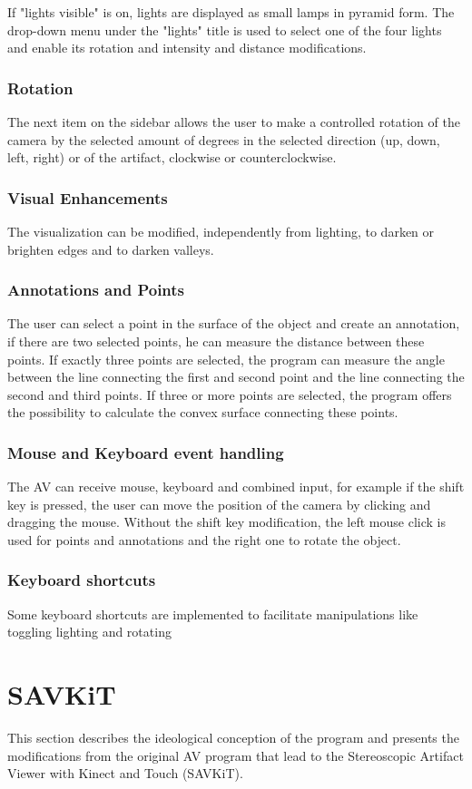 \documentclass[12pt]{extarticle}
\begin{document}
	If "lights visible" is on, lights are displayed as small lamps in pyramid form. The drop-down menu under the "lights" title is used to select one of the four lights and enable its rotation and intensity  and distance modifications.
	\subsubsection { Rotation}
	The next item on the sidebar allows the user to make a controlled rotation of the camera by the selected amount of degrees in the selected direction (up, down, left, right) or of the artifact, clockwise or counterclockwise.
	\subsubsection { Visual Enhancements}
	The visualization can be modified, independently from lighting, to darken or brighten edges and to darken valleys.
	\subsubsection { Annotations and Points}
	The user can select a point in the surface of the object and create an annotation, if there are two selected points, he can measure the distance between these points. If exactly three points are selected, the program can measure the angle between the line connecting the first and second point and the line connecting the second and third points.
	If three or more points are selected, the program offers the possibility to calculate the convex surface connecting these points.
	\subsubsection { Mouse and Keyboard event handling}
	The AV can receive mouse, keyboard and combined input, for example if the shift key is pressed, the user can move the position of the camera by clicking and dragging the mouse. Without the shift key modification, the left mouse click is used for points and annotations and the right one to rotate the object.
	\subsubsection { Keyboard shortcuts}
	Some keyboard shortcuts are implemented to facilitate manipulations like toggling lighting and rotating
	
\section{SAVKiT}\label{sec:Sav}
This section describes the ideological conception of the program and presents the modifications from the original AV program that lead to the Stereoscopic Artifact Viewer with Kinect and Touch (SAVKiT).
\end{document}
